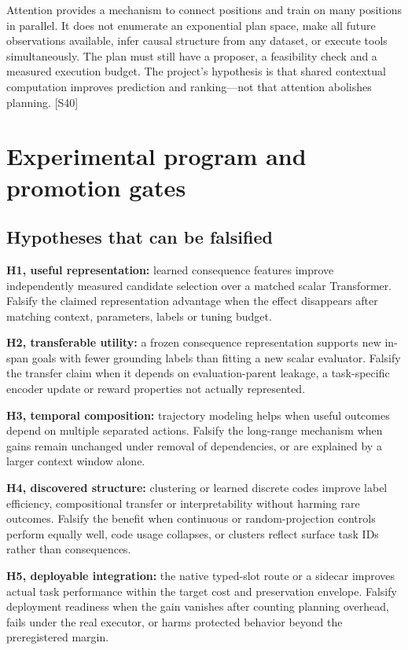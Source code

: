 \documentclass[
  11pt,
  a4paper,
]{article}
\begin{document}
Attention provides a mechanism to connect positions and train on many
positions in parallel. It does not enumerate an exponential plan space,
make all future observations available, infer causal structure from any
dataset, or execute tools simultaneously. The plan must still have a
proposer, a feasibility check and a measured execution budget. The
project's hypothesis is that shared contextual computation improves
prediction and ranking---not that attention abolishes planning.
{[}S40{]}

\section{Experimental program and promotion
gates}\label{experimental-program-and-promotion-gates}

\subsection{Hypotheses that can be
falsified}\label{hypotheses-that-can-be-falsified}

\textbf{H1, useful representation:} learned consequence features improve
independently measured candidate selection over a matched scalar
Transformer. Falsify the claimed representation advantage when the
effect disappears after matching context, parameters, labels or tuning
budget.

\textbf{H2, transferable utility:} a frozen consequence representation
supports new in-span goals with fewer grounding labels than fitting a
new scalar evaluator. Falsify the transfer claim when it depends on
evaluation-parent leakage, a task-specific encoder update or reward
properties not actually represented.

\textbf{H3, temporal composition:} trajectory modeling helps when useful
outcomes depend on multiple separated actions. Falsify the long-range
mechanism when gains remain unchanged under removal of dependencies, or
are explained by a larger context window alone.

\textbf{H4, discovered structure:} clustering or learned discrete codes
improve label efficiency, compositional transfer or interpretability
without harming rare outcomes. Falsify the benefit when continuous or
random-projection controls perform equally well, code usage collapses,
or clusters reflect surface task IDs rather than consequences.

\textbf{H5, deployable integration:} the native typed-slot route or a
sidecar improves actual task performance within the target cost and
preservation envelope. Falsify deployment readiness when the gain
vanishes after counting planning overhead, fails under the real
executor, or harms protected behavior beyond the preregistered margin.
\end{document}
